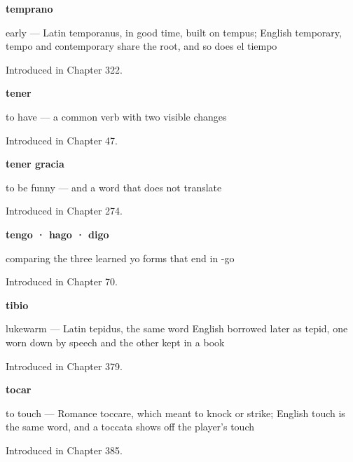 \noindent\begin{minipage}[t]{\linewidth}
\raggedright
\textbf{temprano}\par
\small early — Latin temporanus, in good time, built on tempus; English temporary, tempo and contemporary share the root, and so does el tiempo\par
\footnotesize Introduced in Chapter 322.
\end{minipage}\par\medskip

\noindent\begin{minipage}[t]{\linewidth}
\raggedright
\textbf{tener}\par
\small to have — a common verb with two visible changes\par
\footnotesize Introduced in Chapter 47.
\end{minipage}\par\medskip

\noindent\begin{minipage}[t]{\linewidth}
\raggedright
\textbf{tener gracia}\par
\small to be funny — and a word that does not translate\par
\footnotesize Introduced in Chapter 274.
\end{minipage}\par\medskip

\noindent\begin{minipage}[t]{\linewidth}
\raggedright
\textbf{tengo · hago · digo}\par
\small comparing the three learned yo forms that end in -go\par
\footnotesize Introduced in Chapter 70.
\end{minipage}\par\medskip

\noindent\begin{minipage}[t]{\linewidth}
\raggedright
\textbf{tibio}\par
\small lukewarm — Latin tepidus, the same word English borrowed later as tepid, one worn down by speech and the other kept in a book\par
\footnotesize Introduced in Chapter 379.
\end{minipage}\par\medskip

\noindent\begin{minipage}[t]{\linewidth}
\raggedright
\textbf{tocar}\par
\small to touch — Romance toccare, which meant to knock or strike; English touch is the same word, and a toccata shows off the player's touch\par
\footnotesize Introduced in Chapter 385.
\end{minipage}\par\medskip

